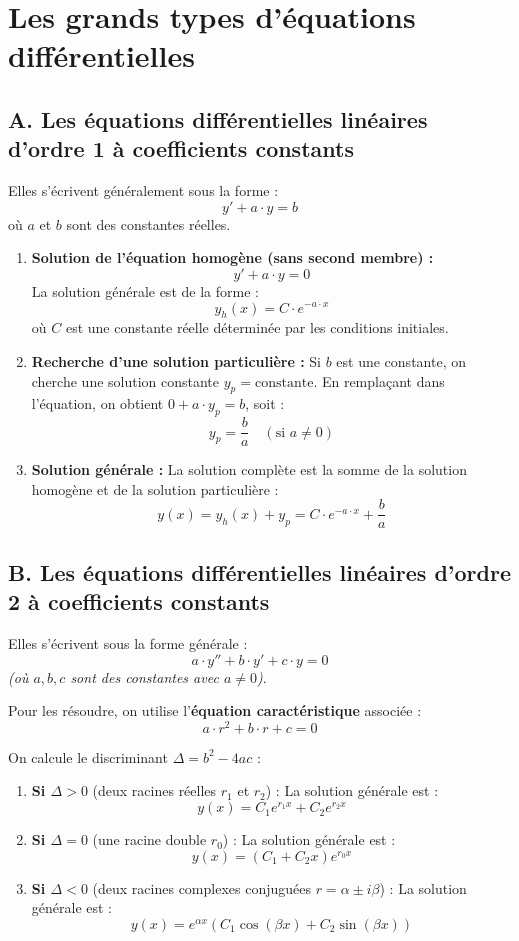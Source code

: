 \documentclass[11pt,a4paper]{article}
\begin{document}
\section{Les grands types d'équations différentielles}

\subsection{A. Les équations différentielles linéaires d'ordre 1 à coefficients constants}
Elles s'écrivent généralement sous la forme :
\[ y' + a \cdot y = b \]
où $a$ et $b$ sont des constantes réelles.

\begin{enumerate}
    \item \textbf{Solution de l'équation homogène (sans second membre) :} 
    \[ y' + a \cdot y = 0 \]
    La solution générale est de la forme :
    \[ y_h(x) = C \cdot e^{-a \cdot x} \]
    où $C$ est une constante réelle déterminée par les conditions initiales.
    
    \item \textbf{Recherche d'une solution particulière :}
    Si $b$ est une constante, on cherche une solution constante $y_p = \text{constante}$. En remplaçant dans l'équation, on obtient $0 + a \cdot y_p = b$, soit :
    \[ y_p = \frac{b}{a} \quad (\text{si } a \neq 0) \]
    
    \item \textbf{Solution générale :}
    La solution complète est la somme de la solution homogène et de la solution particulière :
    \[ y(x) = y_h(x) + y_p = C \cdot e^{-a \cdot x} + \frac{b}{a} \]
\end{enumerate}

\subsection{B. Les équations différentielles linéaires d'ordre 2 à coefficients constants}
Elles s'écrivent sous la forme générale :
\[ a \cdot y'' + b \cdot y' + c \cdot y = 0 \]
\emph{(où $a, b, c$ sont des constantes avec $a \neq 0$)}.

Pour les résoudre, on utilise l'\textbf{équation caractéristique} associée :
\[ a \cdot r^2 + b \cdot r + c = 0 \]

On calcule le discriminant $\Delta = b^2 - 4ac$ :
\begin{enumerate}
    \item \textbf{Si $\Delta > 0$} (deux racines réelles $r_1$ et $r_2$) :
    La solution générale est :
    \[ y(x) = C_1 e^{r_1 x} + C_2 e^{r_2 x} \]
    \item \textbf{Si $\Delta = 0$} (une racine double $r_0$) :
    La solution générale est :
    \[ y(x) = (C_1 + C_2 x) e^{r_0 x} \]
    \item \textbf{Si $\Delta < 0$} (deux racines complexes conjuguées $r = \alpha \pm i\beta$) :
    La solution générale est :
    \[ y(x) = e^{\alpha x} \left( C_1 \cos(\beta x) + C_2 \sin(\beta x) \right) \]
\end{enumerate}
\end{document}
